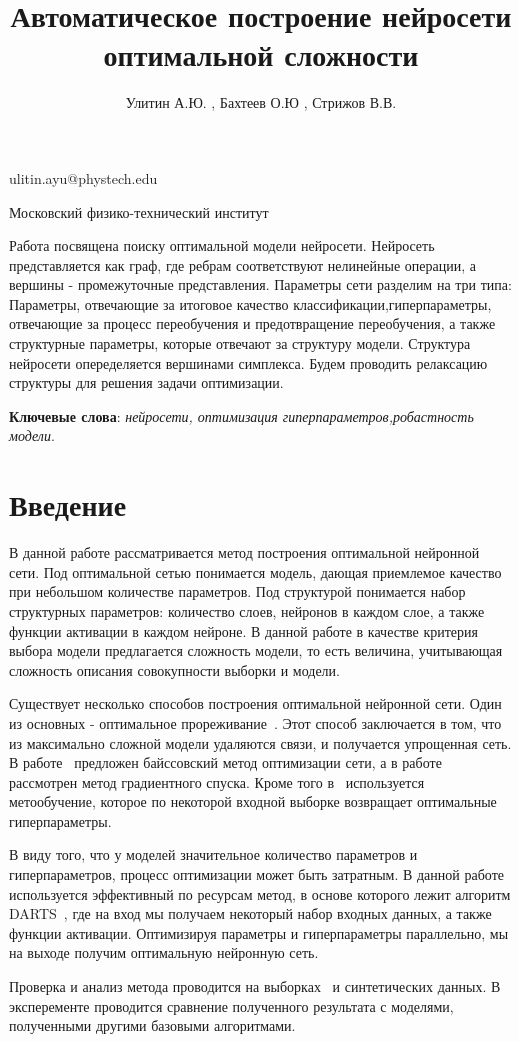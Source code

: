 \documentclass[12pt,twoside]{article}
\begin{document}
\title
    {Автоматическое построение нейросети оптимальной сложности}
\author
    {Улитин А.Ю. , Бахтеев О.Ю , Стрижов В.В.} %
\email
    {ulitin.ayu@phystech.edu}

\organization
    {Московский физико-технический институт}
\abstract
	{Работа посвящена поиску  оптимальной модели нейросети. Нейросеть представляется как граф, где ребрам соответствуют нелинейные операции, а вершины - промежуточные представления. Параметры сети разделим на три типа: Параметры, отвечающие за итоговое качество классификации,гиперпараметры, отвечающие за процесс переобучения и предотвращение переобучения, а также структурные параметры, которые отвечают за структуру  модели. Структура нейросети опеределяется вершинами симплекса. Будем проводить релаксацию структуры для решения задачи оптимизации. 


\bigskip
\textbf{Ключевые слова}: \emph {нейросети, оптимизация гиперпараметров,робастность модели}.

}

\maketitle

\section{Введение}
В данной работе рассматривается метод построения оптимальной нейронной сети. Под оптимальной сетью понимается модель, дающая приемлемое качество при небольшом количестве параметров. Под структурой понимается набор структурных параметров: количество слоев, нейронов в каждом слое, а также функции активации в каждом нейроне. В данной работе в качестве критерия выбора модели предлагается сложность модели, то есть величина, учитывающая сложность описания совокупности выборки и модели.

\par Существует несколько способов построения оптимальной нейронной сети. Один из основных - оптимальное прореживание~\cite{BrainDamage}. Этот способ заключается в том, что из максимально сложной модели удаляются связи, и получается упрощенная сеть. В работе~\cite{BayesOptim}  предложен байссовский метод оптимизации сети, а в работе~\cite{GradientOptim} рассмотрен метод градиентного спуска. Кроме того в~\cite{Met} используется метообучение, которое по некоторой входной выборке возвращает оптимальные гиперпараметры.
\par В виду того, что у моделей значительное количество параметров и гиперпараметров, процесс оптимизации может быть затратным. В данной работе используется эффективный по ресурсам метод, в основе которого лежит алгоритм DARTS~\cite{DARTS}, где на вход мы получаем некоторый набор входных данных, а также функции активации. Оптимизируя параметры и гиперпараметры параллельно, мы на выходе получим оптимальную нейронную сеть.
\par Проверка и анализ метода проводится на выборках~\cite{Boston,MNIST,CIFAR-10} и синтетических данных. В эксперементе проводится сравнение полученного результата с моделями, полученными другими базовыми алгоритмами.
\end{document}
